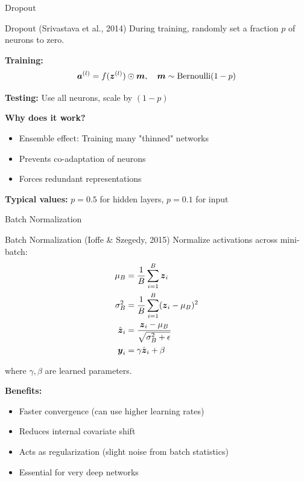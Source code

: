 \documentclass[aspectratio=169]{beamer}
\begin{document}
\begin{frame}{Dropout}
  \begin{definitionbox}{Dropout (Srivastava et al., 2014)}
    During training, randomly set a fraction $p$ of neurons to zero.

    \textbf{Training:}
    \begin{equation}
      \boldsymbol{a}^{(l)} = f(\boldsymbol{z}^{(l)}) \odot \boldsymbol{m}, \quad \boldsymbol{m} \sim \text{Bernoulli}(1-p)
    \end{equation}

    \textbf{Testing:} Use all neurons, scale by $(1-p)$
  \end{definitionbox}

  \vspace{0.5em}

  \textbf{Why does it work?}
  \begin{itemize}
    \item Ensemble effect: Training many "thinned" networks
    \item Prevents co-adaptation of neurons
    \item Forces redundant representations
  \end{itemize}

  \vspace{0.5em}

  \textbf{Typical values:} $p = 0.5$ for hidden layers, $p = 0.1$ for input
\end{frame}

\begin{frame}{Batch Normalization}
  \begin{definitionbox}{Batch Normalization (Ioffe \& Szegedy, 2015)}
    Normalize activations across mini-batch:
    \begin{align}
      \mu_B &= \frac{1}{B} \sum_{i=1}^B \boldsymbol{z}_i \\
      \sigma_B^2 &= \frac{1}{B} \sum_{i=1}^B (\boldsymbol{z}_i - \mu_B)^2 \\
      \hat{\boldsymbol{z}}_i &= \frac{\boldsymbol{z}_i - \mu_B}{\sqrt{\sigma_B^2 + \epsilon}} \\
      \boldsymbol{y}_i &= \gamma \hat{\boldsymbol{z}}_i + \beta
    \end{align}

    where $\gamma, \beta$ are learned parameters.
  \end{definitionbox}

  \vspace{0.5em}

  \textbf{Benefits:}
  \begin{itemize}
    \item Faster convergence (can use higher learning rates)
    \item Reduces internal covariate shift
    \item Acts as regularization (slight noise from batch statistics)
    \item Essential for very deep networks
  \end{itemize}
\end{frame}
\end{document}
